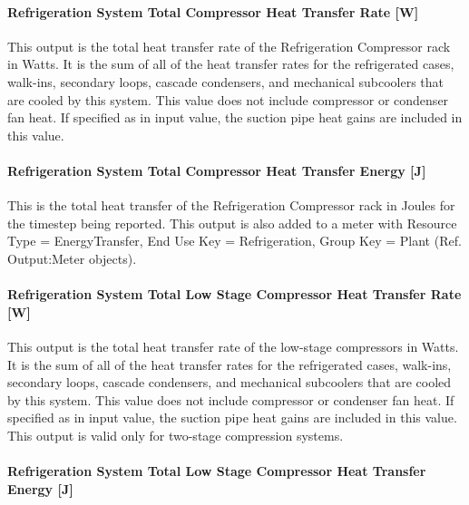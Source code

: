 \paragraph{Refrigeration System Total Compressor Heat Transfer Rate {[}W{]}}\label{refrigeration-system-total-compressor-heat-transfer-rate-w}

This output is the total heat transfer rate of the Refrigeration Compressor rack in Watts. It is the sum of all of the heat transfer rates for the refrigerated cases, walk-ins, secondary loops, cascade condensers, and mechanical subcoolers that are cooled by this system. This value does not include compressor or condenser fan heat. If specified as in input value, the suction pipe heat gains are included in this value.

\paragraph{Refrigeration System Total Compressor Heat Transfer Energy {[}J{]}}\label{refrigeration-system-total-compressor-heat-transfer-energy-j}

This is the total heat transfer of the Refrigeration Compressor rack in Joules for the timestep being reported. This output is also added to a meter with Resource Type = EnergyTransfer, End Use Key = Refrigeration, Group Key = Plant (Ref. Output:Meter objects).

\paragraph{Refrigeration System Total Low Stage Compressor Heat Transfer Rate {[}W{]}}\label{refrigeration-system-total-low-stage-compressor-heat-transfer-rate-w}

This output is the total heat transfer rate of the low-stage compressors in Watts. It is the sum of all of the heat transfer rates for the refrigerated cases, walk-ins, secondary loops, cascade condensers, and mechanical subcoolers that are cooled by this system. This value does not include compressor or condenser fan heat. If specified as in input value, the suction pipe heat gains are included in this value.~ This output is valid only for two-stage compression systems.

\paragraph{Refrigeration System Total Low Stage Compressor Heat Transfer Energy {[}J{]}}\label{refrigeration-system-total-low-stage-compressor-heat-transfer-energy-j}

